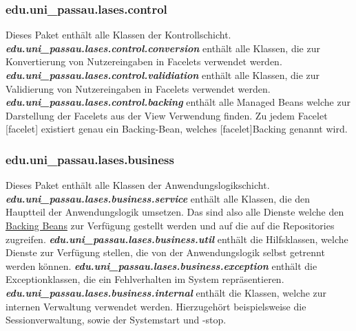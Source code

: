 \subsubsection{edu.uni\_passau.lases.control} \label{arch:control}
Dieses Paket enthält alle Klassen der Kontrollschicht.
\newline\newline
\textbf{\emph{edu.uni\_passau.lases.control.conversion}}
enthält alle Klassen, die zur Konvertierung von Nutzereingaben
in Facelets verwendet werden.
\newline\newline
\textbf{\emph{edu.uni\_passau.lases.control.validiation}}
enthält alle Klassen, die zur Validierung von Nutzereingaben
in Facelets verwendet werden.
\newline\newline
\textbf{\emph{edu.uni\_passau.lases.control.backing}}\label{arch:backing}
enthält alle Managed Beans welche zur Darstellung der Facelets aus der
View Verwendung finden. Zu jedem Facelet [facelet] existiert genau ein
Backing-Bean, welches [facelet]Backing genannt wird.

\subsubsection{edu.uni\_passau.lases.business}\label{arch:business}
Dieses Paket enthält alle Klassen der Anwendungslogikschicht.
\newline\newline
\textbf{\emph{edu.uni\_passau.lases.business.service}}\label{arch:service}
enthält alle Klassen, die den Hauptteil der Anwendungslogik umsetzen.
Das sind also alle Dienste welche den
\hyperref[arch:backing]{Backing Beans} zur Verfügung
gestellt werden und auf die auf die %
Repositories zugreifen.
\newline\newline
\textbf{\emph{edu.uni\_passau.lases.business.util}}
enthält die Hilfsklassen, welche Dienste zur Verfügung stellen,
die von der Anwendungslogik selbst getrennt werden können.
\newline\newline
\textbf{\emph{edu.uni\_passau.lases.business.exception}} \label{arch:busex}
enthält die Exceptionklassen, die ein Fehlverhalten im System repräsentieren.
\newline\newline
\textbf{\emph{edu.uni\_passau.lases.business.internal}}
enthält die Klassen, welche zur internen Verwaltung verwendet werden.
Hierzugehört beispielsweise die Sessionverwaltung, sowie der Systemstart und -stop.


